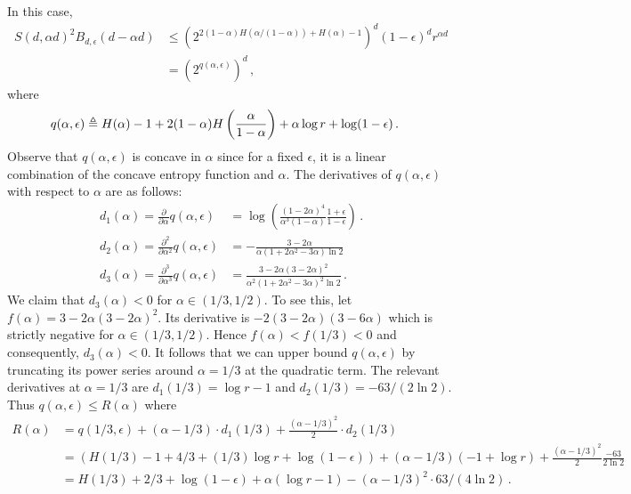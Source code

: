   In this case, 
  \begin{align*}
  S(d,\alpha d)^2 B_{d,\epsilon}(d-\alpha d)
  &\leq \left( 2^{2(1-\alpha)H(\alpha/(1-\alpha)) + H(\alpha) - 1} \right)^d (1-\epsilon)^d 
   r^{\alpha d} \\
  &=\left( 2^{q(\alpha, \epsilon)} \right)^d\, ,
  \end{align*}
  where
  \begin{align*}
  q(\alpha, \epsilon)
  &\triangleq H(\alpha) - 1 + 2(1-\alpha) H\left(\frac{\alpha}{1-\alpha}\right) 
  + \alpha \log r +\log(1-\epsilon)\,.
  \end{align*}
  Observe that $q(\alpha, \epsilon)$ is concave in $\alpha$ since for a fixed $\epsilon$, it is a linear combination of the concave entropy function and $\alpha$.  
  The derivatives of $q(\alpha, \epsilon)$ with respect to $\alpha$ are as follows:
  \begin{align*}
  d_1(\alpha) = \frac{\partial}{\partial \alpha}q(\alpha, \epsilon)
   &= \log \left(\frac{(1-2\alpha)^4}{\alpha^3(1-\alpha)}  \frac{1+\epsilon}{1-\epsilon} \right)\, .\\
  d_2(\alpha) = \frac{\partial^2}{\partial \alpha^2}q(\alpha, \epsilon)
  &= -\frac{3-2\alpha}{\alpha(1+2\alpha^2 -3\alpha) \ln 2} \\
  d_3(\alpha) = \frac{\partial^3}{\partial \alpha^3}q(\alpha, \epsilon)
  &= \frac{3-2\alpha( 3-2\alpha)^2}{\alpha^2(1+2\alpha^2 -3\alpha)^2 \ln 2}
  \, .
  \end{align*}
  We claim that $d_3(\alpha) < 0$ for $\alpha \in (1/3, 1/2)$. 
  To see this, let $f(\alpha) = 3 - 2\alpha(3 - 2\alpha)^2$. 
  Its derivative is $-2(3 - 2\alpha)(3 - 6\alpha)$ which is strictly negative for $\alpha \in (1/3, 1/2)$. 
  Hence $f(\alpha) < f(1/3) < 0$ and consequently, $d_3(\alpha) < 0$. 
  It follows that we can upper bound $q(\alpha, \epsilon)$ 
  by truncating its power series around $\alpha = 1/3$ 
  at the quadratic term. 
  The relevant derivatives at $\alpha = 1/3$ are 
  $d_1(1/3) = \log r - 1$ and
  $d_2(1/3) = -63/(2 \ln 2)$. 
  Thus $q(\alpha, \epsilon) \leq R(\alpha)$ where
  \begin{align*}
  R(\alpha)
  &= q(1/3, \epsilon) + (\alpha-1/3)\cdot d_1(1/3) + \frac{(\alpha-1/3)^2}{2}\cdot d_2(1/3) \\
  &= \left( H(1/3) - 1 + 4/3
      + (1/3)\log r + \log(1-\epsilon) \right)
      + (\alpha-1/3) \left( -1 + \log r \right)
      + \frac{(\alpha-1/3)^2}{2} \frac{-63}{2\ln 2}
  \\
  &= H(1/3) + 2/3 + \log(1-\epsilon) 
      + \alpha (\log r - 1) 
      - (\alpha-1/3)^2 \cdot 63/(4\ln 2)
      \,.
  \end{align*}
